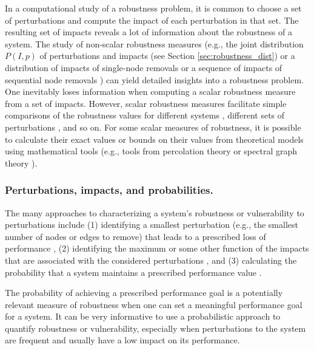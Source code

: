 \documentclass{comnet-mod}
\begin{document}
In a computational study of a robustness problem, it is common to choose a set of perturbations and compute the impact of each perturbation in that set. The resulting set of impacts reveals a lot of information about the robustness of a system. The study of non-scalar robustness measures (e.g., the joint distribution $P(I,p)$ of perturbations and impacts (see Section \ref{sec:robustness_dist}) or a distribution of impacts of single-node removals or a sequence of impacts of sequential node removals \cite{Albert2000, Dartnell2005, Newman2008, Pu2012, Hossain2013, Sha2013, Lordan2014, Nie2015, DeDomenico2017, Galias2017, Kaiser-Bunbury2010}) can yield detailed insights into a robustness problem. One inevitably loses information when computing a scalar robustness measure from a set of impacts. However, scalar robustness measures facilitate simple comparisons of the robustness values for different systems \cite{Ventresca2014}, different sets of perturbations \cite{Iyer2013}, and so on. For some scalar measures of robustness, it is possible to calculate their exact values or bounds on their values from theoretical models using mathematical tools (e.g., tools from percolation theory \cite{Kesten1982, Stauffer2018} or spectral graph theory \cite{VanMieghem2023}). 


\subsubsection{Perturbations, impacts, and probabilities.}

The many approaches to characterizing a system's robustness or vulnerability to perturbations include (1) identifying a smallest perturbation (e.g., the smallest number of nodes or edges to remove) that leads to a prescribed loss of performance \cite{Cohen2000, Dunne2002, Shargel2003, Dunne2004, Paul2004, Tanizawa2005, VanMieghem2005, Wang2006, Sole2008, Wang2008, Cohen2010, Shang2012, Rosas-Casals2007}, (2) identifying the maximum or some other function of the impacts that are associated with the considered perturbations \cite{Latora2005, Herrmann2011, Mello2011, Mello2011a, Schneider2011, Zeng2012, Louzada2013, Zhou2014, Ahmadi2015, Hong2017}, and (3) calculating the probability that a system maintains a prescribed performance value \cite{Henneaux2015, Henneaux2015a, Panteli2015, Phan2018}.

The probability of achieving a prescribed performance goal is a potentially relevant measure of robustness when one can set a meaningful performance goal for a system. It can be very informative to use a probabilistic approach to quantify robustness or vulnerability, especially when perturbations to the system are frequent and usually have a low impact on its performance.
\end{document}
